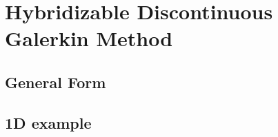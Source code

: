\documentclass[oneside]{article}
\begin{document}
\section{Hybridizable Discontinuous Galerkin Method}
  \subsection{General Form}
  \subsection{1D example}
\end{document}
